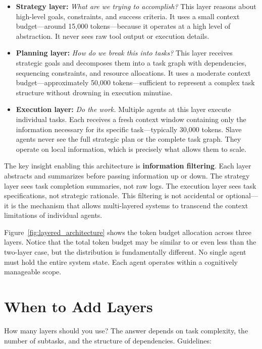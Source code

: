 \begin{itemize}
\item \textbf{Strategy layer:} \textit{What are we trying to accomplish?} This layer reasons about high-level goals, constraints, and success criteria. It uses a small context budget—around 15,000 tokens—because it operates at a high level of abstraction. It never sees raw tool output or execution details.

\item \textbf{Planning layer:} \textit{How do we break this into tasks?} This layer receives strategic goals and decomposes them into a task graph with dependencies, sequencing constraints, and resource allocations. It uses a moderate context budget—approximately 50,000 tokens—sufficient to represent a complex task structure without drowning in execution minutiae.

\item \textbf{Execution layer:} \textit{Do the work.} Multiple agents at this layer execute individual tasks. Each receives a fresh context window containing only the information necessary for its specific task—typically 30,000 tokens. Slave agents never see the full strategic plan or the complete task graph. They operate on local information, which is precisely what allows them to scale.
\end{itemize}

The key insight enabling this architecture is \textbf{information filtering}. Each layer abstracts and summarizes before passing information up or down. The strategy layer sees task completion summaries, not raw logs. The execution layer sees task specifications, not strategic rationale. This filtering is not accidental or optional—it is the mechanism that allows multi-layered systems to transcend the context limitations of individual agents.

Figure~\ref{fig:layered_architecture} shows the token budget allocation across three layers. Notice that the total token budget may be similar to or even less than the two-layer case, but the distribution is fundamentally different. No single agent must hold the entire system state. Each agent operates within a cognitively manageable scope.

\section{When to Add Layers}\label{sec:when_layers}

How many layers should you use? The answer depends on task complexity, the number of subtasks, and the structure of dependencies. Guidelines:

